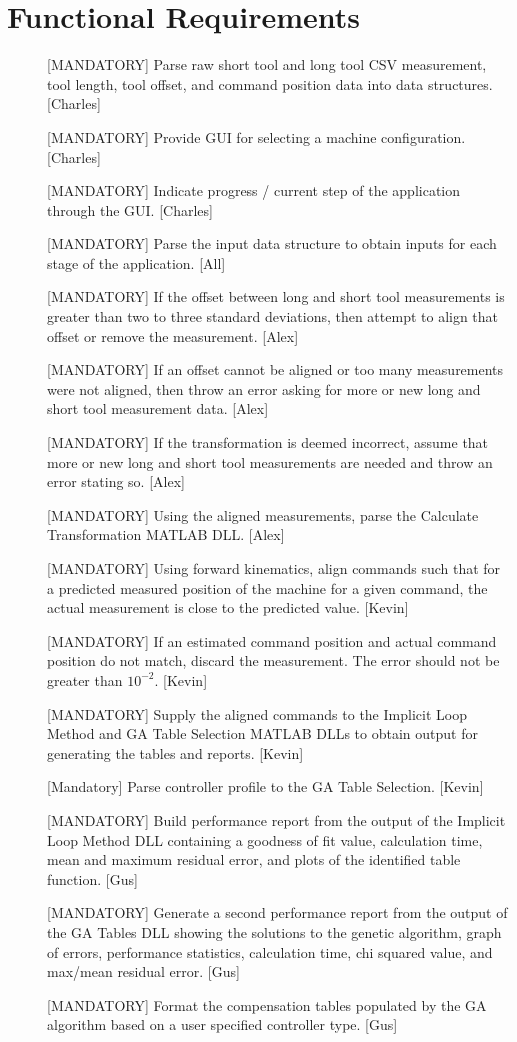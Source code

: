\documentclass[pdftex,10pt,a4paper]{article}
\begin{document}
\newpage

\section*{Functional Requirements}
\begin{description}
\item[] [MANDATORY] Parse raw short tool and long tool CSV measurement, tool length, tool offset, and command position data into data structures. [Charles]
\item[] [MANDATORY] Provide GUI for selecting a machine configuration. [Charles]
\item[] [MANDATORY] Indicate progress / current step of the application through the GUI. [Charles]
\item[] [MANDATORY] Parse the input data structure to obtain inputs for each stage of the application. [All]
\item[] [MANDATORY] If the offset between long and short tool measurements is greater than two to three standard deviations, then attempt to align that offset or remove the measurement. [Alex]
\item[] [MANDATORY] If an offset cannot be aligned or too many measurements were not aligned, then throw an error asking for more or new long and short tool measurement data. [Alex]
\item[] [MANDATORY] If the transformation is deemed incorrect, assume that more or new long and short tool measurements are needed and throw an error stating so. [Alex]
\item[] [MANDATORY] Using the aligned measurements, parse the Calculate Transformation MATLAB DLL. [Alex]
\item[] [MANDATORY] Using forward kinematics, align commands such that for a predicted measured position of the machine for a given command, the actual measurement is close to the predicted value. [Kevin]
\item[] [MANDATORY] If an estimated command position and actual command position do not match, discard the measurement. The error should not be greater than $10^{-2}$. [Kevin]
\item[] [MANDATORY] Supply the aligned commands to the Implicit Loop Method and GA Table Selection MATLAB DLLs to obtain output for generating the tables and reports. [Kevin]
\item[] [Mandatory]  Parse controller profile to the GA Table Selection. [Kevin]
\item[] [MANDATORY] Build performance report from the output of the Implicit Loop Method DLL containing a goodness of fit value, calculation time, mean and maximum residual error, and plots of the identified table function. [Gus]
\item[] [MANDATORY] Generate a second performance report from the output of the GA Tables DLL showing the solutions to the genetic algorithm, graph of errors, performance statistics, calculation time, chi squared value, and max/mean residual error. [Gus]
\item[] [MANDATORY] Format the compensation tables populated by the GA algorithm based on a user specified controller type. [Gus]
\end{description}
\end{document}
